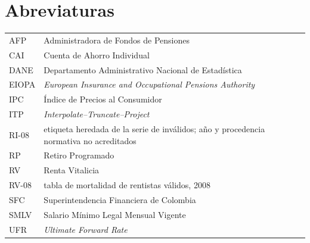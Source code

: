 \section*{Abreviaturas}

\begin{longtable}{@{}p{}p{}@{}}
\toprule
AFP & Administradora de Fondos de Pensiones \\
CAI & Cuenta de Ahorro Individual \\
DANE & Departamento Administrativo Nacional de Estadística \\
EIOPA & \emph{European Insurance and Occupational Pensions Authority} \\
IPC & Índice de Precios al Consumidor \\
ITP & \emph{Interpolate--Truncate--Project} \\
RI-08 & etiqueta heredada de la serie de inválidos; año y procedencia normativa no acreditados \\
RP & Retiro Programado \\
RV & Renta Vitalicia \\
RV-08 & tabla de mortalidad de rentistas válidos, 2008 \\
SFC & Superintendencia Financiera de Colombia \\
SMLV & Salario Mínimo Legal Mensual Vigente \\
UFR & \emph{Ultimate Forward Rate} \\
\bottomrule
\end{longtable}
